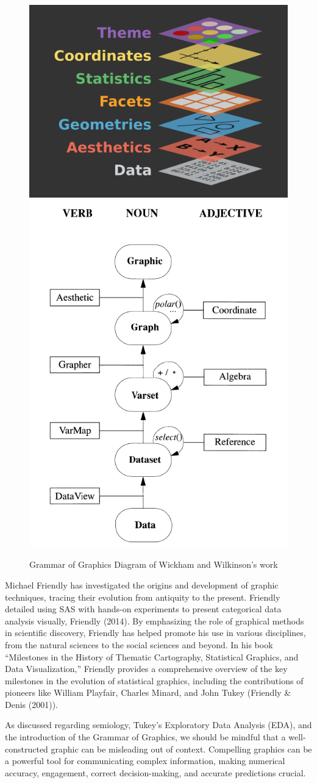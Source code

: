 \documentclass[print]{nuthesis}
\begin{document}
\begin{figure}

{\centering \includegraphics[width=0.45\linewidth]{figure/gglayers} \includegraphics[width=0.45\linewidth]{figure/graphic-flowchart} 

}

\caption{Grammar of Graphics Diagram of Wickham and Wilkinson's work}\label{fig:graphics2}
\end{figure}

Michael Friendly has investigated the origins and development of graphic techniques, tracing their evolution from antiquity to the present.
Friendly detailed using SAS with hands-on experiments to present categorical data analysis visually, Friendly (2014).
By emphasizing the role of graphical methods in scientific discovery, Friendly has helped promote his use in various disciplines, from the natural sciences to the social sciences and beyond.
In his book ``Milestones in the History of Thematic Cartography, Statistical Graphics, and Data Visualization,'' Friendly provides a comprehensive overview of the key milestones in the evolution of statistical graphics, including the contributions of pioneers like William Playfair, Charles Minard, and John Tukey (Friendly \& Denis (2001)).

As discussed regarding semiology, Tukey's Exploratory Data Analysis (EDA), and the introduction of the Grammar of Graphics, we should be mindful that a well-constructed graphic can be misleading out of context.
Compelling graphics can be a powerful tool for communicating complex information, making numerical accuracy, engagement, correct decision-making, and accurate predictions crucial.
\end{document}
